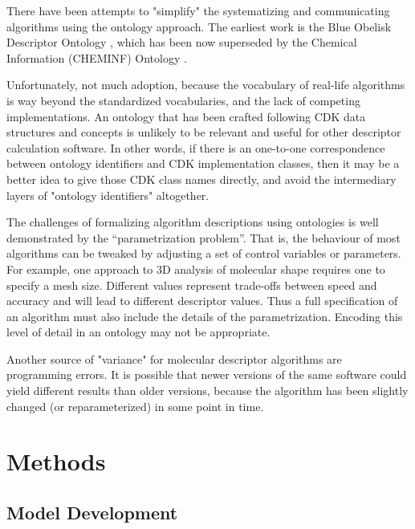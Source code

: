 \documentclass[12pt,letterpaper]{article}
\begin{document}
There have been attempts to "simplify" the systematizing and
communicating algorithms using the ontology approach. The earliest
work is the Blue Obelisk Descriptor Ontology \cite{Guha:2006ac}, which
has been now superseded by the Chemical Information (CHEMINF) Ontology
\cite{Hastings:2011rf}.

Unfortunately, not much adoption, because the vocabulary of
real-life algorithms is way beyond the standardized vocabularies, and
the lack of competing implementations. An ontology that has been
crafted following CDK data structures and concepts is unlikely to be
relevant and useful for other descriptor calculation software. In
other words, if there is an one-to-one correspondence between ontology
identifiers and CDK implementation classes, then it may be a better
idea to give those CDK class names directly, and avoid the
intermediary layers of "ontology identifiers" altogether.

The challenges of formalizing algorithm descriptions using ontologies
is well demonstrated by the ``parametrization problem''.  That is, the
behaviour of most algorithms can be tweaked by adjusting a set of
control variables or parameters. For example, one approach to 3D
analysis of molecular shape requires one to specify a mesh
size. Different values represent trade-offs between speed and accuracy
and will lead to different descriptor values. Thus a full
specification of an algorithm must also include the details of the
parametrization. Encoding this level of detail in an ontology may not
be appropriate.

Another source of "variance" for molecular descriptor
algorithms are programming errors. It is possible that newer versions
of the same software could yield different results than older
versions, because the algorithm has been slightly changed (or
reparameterized) in some point in time.

\section{Methods}
\label{sec:methods}

\subsection{Model Development}
\label{sec:model-development}
\end{document}
